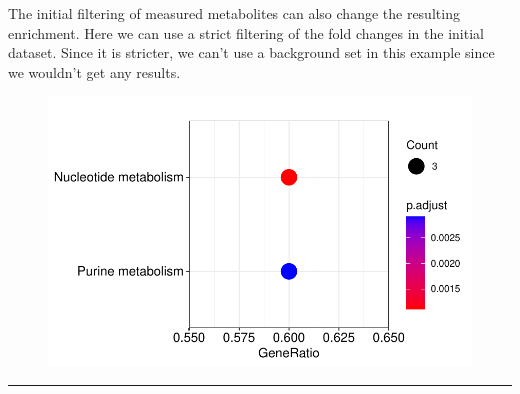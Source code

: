 \documentclass[
  24px,
  letterpaper,
  DIV=11,
  numbers=noendperiod]{scrartcl}
\newenvironment{Shaded}{\begin{snugshade}}{\end{snugshade}}
\newcommand{\AttributeTok}[1]{\textcolor[rgb]{0.40,0.45,0.13}{#1}}
\newcommand{\DecValTok}[1]{\textcolor[rgb]{0.68,0.00,0.00}{#1}}
\newcommand{\FunctionTok}[1]{\textcolor[rgb]{0.28,0.35,0.67}{#1}}
\newcommand{\NormalTok}[1]{\textcolor[rgb]{0.00,0.23,0.31}{#1}}
\newcommand{\OtherTok}[1]{\textcolor[rgb]{0.00,0.23,0.31}{#1}}
\newcommand{\SpecialCharTok}[1]{\textcolor[rgb]{0.37,0.37,0.37}{#1}}
\begin{document}
The initial filtering of measured metabolites can also change the
resulting enrichment. Here we can use a strict filtering of the fold
changes in the initial dataset. Since it is stricter, we can't use a
background set in this example since we wouldn't get any results.

\begin{Shaded}
\end{Shaded}

\begin{figure}[H]

{\centering \includegraphics{index_files/figure-pdf/unnamed-chunk-23-1.pdf}

}

\end{figure}

\begin{center}\rule{0.5\linewidth}{0.5pt}\end{center}
\end{document}
